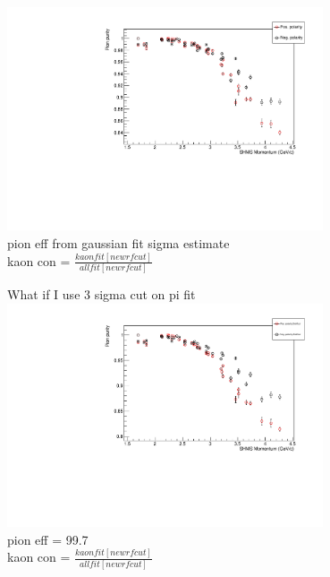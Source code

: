 \documentclass[aspectratio=169,xcolor=dvipsnames]{beamer}
\begin{document}
\begin{frame}  
\includegraphics[width = 0.7\textwidth]{results/pid/SHMS_rf_momentum.pdf}
\\
pion eff from gaussian fit sigma estimate \\
kaon con = $\frac{kaonfit[new rfcut]}{allfit[new rfcut]}$
\\

\end{frame}
\begin{frame}{What if I use 3 sigma cut on pi fit}  
\includegraphics[width = 0.7\textwidth]{results/pid/SHMS_rf_momentum_2nd.pdf}
\\
pion eff = 99.7\\
kaon con = $\frac{kaonfit[new rfcut]}{allfit[new rfcut]}$
\end{frame}
\end{document}
